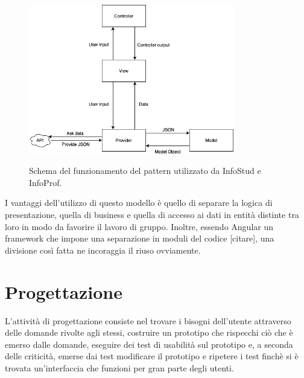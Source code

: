 \documentclass[Lau, oneside, noexaminfo]{sapthesis}%
\begin{document}
\begin{figure}[H]
	\caption{Schema del funzionamento del pattern utilizzato da InfoStud e InfoProf.}
	\centering
	\includegraphics[width=0.8\textwidth]{arch-pattern-img}
	\label{fig:pattern}
\end{figure}

I vantaggi dell'utilizzo di questo modello è quello di separare la logica di presentazione, quella di business e quella di accesso ai dati in entità distinte tra loro in modo da favorire il lavoro di gruppo. Inoltre, essendo Angular un framework che impone una separazione in moduli del codice [citare], una divisione così fatta ne incoraggia il riuso ovviamente.


\chapter{Progettazione}
\label{ch:3}

L'attività di progettazione consiste nel trovare i bisogni dell'utente attraverso delle domande rivolte agli stessi, costruire un prototipo che rispecchi ciò che è emerso dalle domande, eseguire dei test di usabilità sul prototipo e, a seconda delle criticità, emerse dai test modificare il prototipo e ripetere i test finchè si è trovata un'interfaccia che funzioni per gran parte degli utenti.
\end{document}
